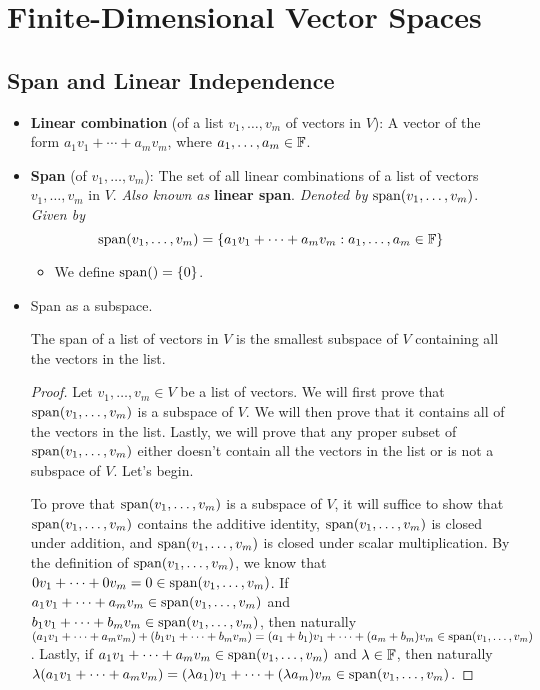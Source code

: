 \documentclass[../main.tex]{subfiles}
\begin{document}
\chapter{Finite-Dimensional Vector Spaces}
\section{Span and Linear Independence}
\begin{itemize}
    \item {}\textbf{Linear combination} (of a list $v_1,\dots,v_m$ of vectors in $V$): A vector of the form $a_1v_1+\cdots+a_mv_m$, where $a_1,\dots,a_m\in\mathbb{F}$.
    \item \textbf{Span} (of $v_1,\dots,v_m$): The set of all linear combinations of a list of vectors $v_1,\dots,v_m$ in $V$. \emph{Also known as} \textbf{linear span}. \emph{Denoted by} $\operatorname{span}(v_1,\dots,v_m)$. \emph{Given by}
    \begin{equation*}
        \operatorname{span}(v_1,\dots,v_m) = \{a_1v_1+\cdots+a_mv_m:a_1,\dots,a_m\in\mathbb{F}\}
    \end{equation*}
    \begin{itemize}
        \item We define $\operatorname{span}()=\{0\}$.
    \end{itemize}
    \item Span as a subspace.
    \begin{theorem}
        The span of a list of vectors in $V$ is the smallest subspace of $V$ containing all the vectors in the list.
        \begin{proof}
            Let $v_1,\dots,v_m\in V$ be a list of vectors. We will first prove that $\operatorname{span}(v_1,\dots,v_m)$ is a subspace of $V$. We will then prove that it contains all of the vectors in the list. Lastly, we will prove that any proper subset of $\operatorname{span}(v_1,\dots,v_m)$ either doesn't contain all the vectors in the list or is not a subspace of $V$. Let's begin.\par
            To prove that $\operatorname{span}(v_1,\dots,v_m)$ is a subspace of $V$, it will suffice to show that $\operatorname{span}(v_1,\dots,v_m)$ contains the additive identity, $\operatorname{span}(v_1,\dots,v_m)$ is closed under addition, and $\operatorname{span}(v_1,\dots,v_m)$ is closed under scalar multiplication. By the definition of $\operatorname{span}(v_1,\dots,v_m)$, we know that $0v_1+\dots+0v_m=0\in\operatorname{span}(v_1,\dots,v_m)$. If $a_1v_1+\cdots+a_mv_m\in\operatorname{span}(v_1,\dots,v_m)$ and $b_1v_1+\cdots+b_mv_m\in\operatorname{span}(v_1,\dots,v_m)$, then naturally $(a_1v_1+\cdots+a_mv_m)+(b_1v_1+\cdots+b_mv_m)=(a_1+b_1)v_1+\cdots+(a_m+b_m)v_m\in\operatorname{span}(v_1,\dots,v_m)$. Lastly, if $a_1v_1+\cdots+a_mv_m\in\operatorname{span}(v_1,\dots,v_m)$ and $\lambda\in\mathbb{F}$, then naturally $\lambda(a_1v_1+\cdots+a_mv_m)=(\lambda a_1)v_1+\cdots+(\lambda a_m)v_m\in\operatorname{span}(v_1,\dots,v_m)$.\par

\end{proof}
\end{theorem}
\end{itemize}
\end{document}
